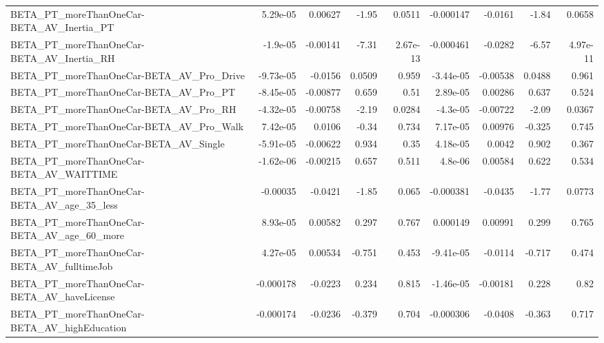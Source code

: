 \begin{tabular}{lrrrrrrrr}
BETA\_PT\_moreThanOneCar-BETA\_AV\_Inertia\_PT          &    5.29e-05 &      0.00627 &    -1.95 &   0.0511 &  -0.000147 &     -0.0161 &        -1.84 &        0.0658 \\
BETA\_PT\_moreThanOneCar-BETA\_AV\_Inertia\_RH          &    -1.9e-05 &     -0.00141 &    -7.31 & 2.67e-13 &  -0.000461 &     -0.0282 &        -6.57 &      4.97e-11 \\
BETA\_PT\_moreThanOneCar-BETA\_AV\_Pro\_Drive           &   -9.73e-05 &      -0.0156 &   0.0509 &    0.959 &  -3.44e-05 &    -0.00538 &       0.0488 &         0.961 \\
BETA\_PT\_moreThanOneCar-BETA\_AV\_Pro\_PT              &   -8.45e-05 &     -0.00877 &    0.659 &     0.51 &   2.89e-05 &     0.00286 &        0.637 &         0.524 \\
BETA\_PT\_moreThanOneCar-BETA\_AV\_Pro\_RH              &   -4.32e-05 &     -0.00758 &    -2.19 &   0.0284 &   -4.3e-05 &    -0.00722 &        -2.09 &        0.0367 \\
BETA\_PT\_moreThanOneCar-BETA\_AV\_Pro\_Walk            &    7.42e-05 &       0.0106 &    -0.34 &    0.734 &   7.17e-05 &     0.00976 &       -0.325 &         0.745 \\
BETA\_PT\_moreThanOneCar-BETA\_AV\_Single              &   -5.91e-05 &     -0.00622 &    0.934 &     0.35 &   4.18e-05 &      0.0042 &        0.902 &         0.367 \\
BETA\_PT\_moreThanOneCar-BETA\_AV\_WAITTIME            &   -1.62e-06 &     -0.00215 &    0.657 &    0.511 &    4.8e-06 &     0.00584 &        0.622 &         0.534 \\
BETA\_PT\_moreThanOneCar-BETA\_AV\_age\_35\_less         &    -0.00035 &      -0.0421 &    -1.85 &    0.065 &  -0.000381 &     -0.0435 &        -1.77 &        0.0773 \\
BETA\_PT\_moreThanOneCar-BETA\_AV\_age\_60\_more         &    8.93e-05 &      0.00582 &    0.297 &    0.767 &   0.000149 &     0.00991 &        0.299 &         0.765 \\
BETA\_PT\_moreThanOneCar-BETA\_AV\_fulltimeJob         &    4.27e-05 &      0.00534 &   -0.751 &    0.453 &  -9.41e-05 &     -0.0114 &       -0.717 &         0.474 \\
BETA\_PT\_moreThanOneCar-BETA\_AV\_haveLicense         &   -0.000178 &      -0.0223 &    0.234 &    0.815 &  -1.46e-05 &    -0.00181 &        0.228 &          0.82 \\
BETA\_PT\_moreThanOneCar-BETA\_AV\_highEducation       &   -0.000174 &      -0.0236 &   -0.379 &    0.704 &  -0.000306 &     -0.0408 &       -0.363 &         0.717 \\

\end{tabular}
